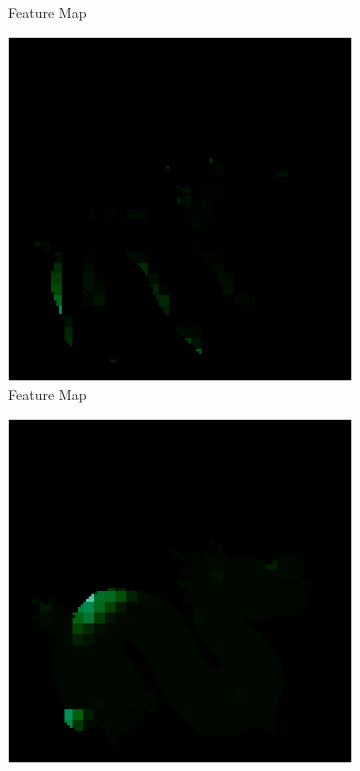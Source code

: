 \begin{figure}[H]
\begin{subfigure}[b]{0.19\linewidth}
		\caption{Feature Map}
	\end{subfigure}
	\begin{subfigure}[b]{0.19\linewidth}
		\includegraphics[width=\linewidth]{./Figures/feature_map_gcnn/feature_map_gcnn-noc_45.png}
		\caption{Feature Map}
	\end{subfigure}
	\begin{subfigure}[b]{0.19\linewidth}
		\includegraphics[width=\linewidth]{./Figures/feature_map_gcnn/feature_map_gcnn-noc_93.png}

\end{subfigure}
\end{figure}
